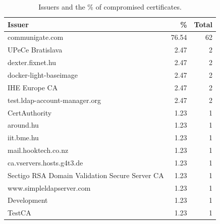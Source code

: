 \begin{table}
\centering
\footnotesize
\caption{Issuers and the \% of compromised certificates.}
\begin{tabular}{lrr}
\toprule
\textbf{Issuer} & \textbf{\%} & \textbf{Total} \\
\midrule
communigate.com & 76.54 & 62 \\
UPeCe Bratislava & 2.47 & 2 \\
dexter.fixnet.hu & 2.47 & 2 \\
docker-light-baseimage & 2.47 & 2 \\
IHE Europe CA & 2.47 & 2 \\
test.ldap-account-manager.org & 2.47 & 2 \\
CertAuthority & 1.23 & 1 \\
around.hu & 1.23 & 1 \\
iit.bme.hu & 1.23 & 1 \\
mail.hooktech.co.nz & 1.23 & 1 \\
ca.vservers.hosts.g4t3.de & 1.23 & 1 \\
Sectigo RSA Domain Validation Secure Server CA & 1.23 & 1 \\
www.simpleldapserver.com & 1.23 & 1 \\
Development & 1.23 & 1 \\
TestCA & 1.23 & 1 \\
\bottomrule
\end{tabular}
\label{tab:issuers-compromised_certs}
\end{table}